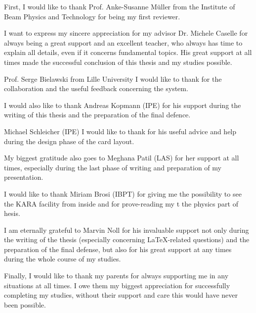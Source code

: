 First, I would like to thank Prof. Anke-Susanne Müller from the Institute of Beam Physics and Technology for being my first reviewer.

I want to express my sincere appreciation for my advisor Dr. Michele Caselle for always being a great support and an excellent teacher, who always has time to explain all details, even if it concerns fundamental topics. 
His great support at all times made the successful conclusion of this thesis and my studies possible.

Prof. Serge Bielawski from Lille University I would like to thank for the collaboration and the useful feedback concerning the system.

I would also like to thank Andreas Kopmann (IPE) for his support during the writing of this thesis and the preparation of the final defence.

Michael Schleicher (IPE) I would like to thank for his useful advice and help during the design phase of the card layout.

My biggest gratitude also goes to Meghana Patil (LAS)  for her support at all times, especially during the last phase of writing and preparation of my presentation.

I would like to thank Miriam Brosi (IBPT) for giving me the possibility to see the KARA facility from inside and for prove-reading my t the physics part of hesis.

I am eternally grateful to Marvin Noll for his invaluable support not only during the writing of the thesis (especially concerning LaTeX-related questions) and the preparation of the final defense, but also for his great support at any times during the whole course of my studies.

Finally, I would like to thank my parents for always supporting me in any situations at all times. I owe them my biggest appreciation for successfully completing my studies, without their support and care this would have never been possible.

